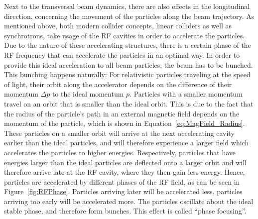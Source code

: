 Next to the transversal beam dynamics, there are also effects in the longitudinal direction, concerning the movement of the particles along the beam trajectory.
As mentioned above, both modern collider concepts, linear colliders as well as synchrotrons, take usage of the RF cavities in order to accelerate the particles.
Due to the nature of these accelerating structures, there is a certain phase of the RF frequency that can accelerate the particles in an optimal way.
In order to provide this ideal acceleration to all beam particles, the beam has to be bunched.
This bunching happens naturally:
For relativistic particles traveling at the speed of light, their orbit along the accelerator depends on the difference of their momentum $\Delta p$ to the ideal momentum $p$.
Particles with a smaller momentum travel on an orbit that is smaller than the ideal orbit.
This is due to the fact that the radius of the particle's path in an external magnetic field depends on the momentum of the particle, which is shown in Equation~\ref{eq:MagField_Radius}.
These particles on a smaller orbit will arrive at the next accelerating cavity earlier than the ideal particles, and will therefore experience a larger field which accelerates the particles to higher energies.
Respectively, particles that have energies larger than the ideal particles are deflected onto a larger orbit and will therefore arrive late at the RF cavity, where they then gain less energy. 
Hence, particles are accelerated by different phases of the RF field, as can be seen in Figure~\ref{fig:RFPhase}.
Particles arriving later will be accelerated less, particles arriving too early will be accelerated more.
The particles oscillate about the ideal stable phase, and therefore form bunches.
This effect is called ``phase focusing''.
